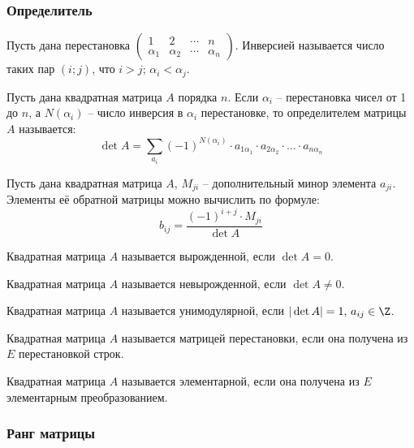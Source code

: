 \documentclass[12pt]{article}
\begin{document}
\subsubsection{Определитель}

\begin{definition}
    Пусть дана перестановка $\begin{pmatrix}
        1 & 2 & \cdots & n\\
        \alpha_1 & \alpha_2 & \cdots & \alpha_n
    \end{pmatrix}$. Инверсией называется число таких пар $(i;j)$, что $i>j;\,\alpha_i<\alpha_j$.
\end{definition}
\begin{definition}
    Пусть дана квадратная матрица $A$ порядка $n$. Если $\alpha_i$ – перестановка чисел от 1 до $n$, а $N(\alpha_i)$ – число инверсия в $\alpha_i$ перестановке, то определителем матрицы $A$ называется:
    $$\det A=\sum_{a_i}(-1)^{N(\alpha_i)}\cdot a_{1\alpha_1}\cdot a_{2\alpha_2}\cdot\ldots\cdot a_{n\alpha_n}$$
\end{definition}
\begin{theorem}
    Пусть дана квадратная матрица $A$, $M_{ji}$ – дополнительный минор элемента $a_{ji}$. Элементы её обратной матрицы можно вычислить по формуле:
    $$b_{ij}=\frac{(-1)^{i+j}\cdot M_{ji}}{\det A}$$
\end{theorem}
\begin{definition}
    Квадратная матрица $A$ называется вырожденной, если $\det A=0$.
\end{definition}
\begin{definition}
    Квадратная матрица $A$ называется невырожденной, если $\det A\neq0$.
\end{definition}
\begin{definition}
    Квадратная матрица $A$ называется унимодулярной, если $|\det A|=1,\,a_{ij}\in\Z$.
\end{definition}
\begin{definition}
    Квадратная матрица $A$ называется матрицей перестановки, если она получена из $E$ перестановкой строк.
\end{definition}
\begin{definition}
    Квадратная матрица $A$ называется элементарной, если она получена из $E$ элементарным преобразованием.
\end{definition}

\subsubsection{Ранг матрицы}
\end{document}
